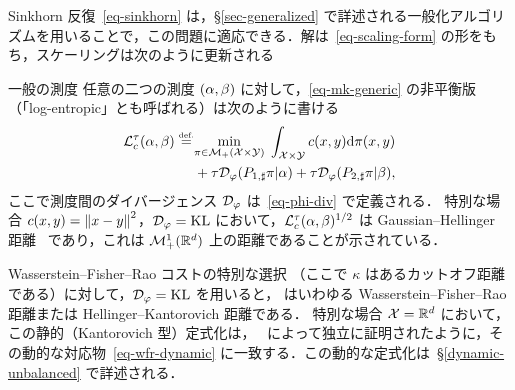Sinkhorn 反復~\eqref{eq-sinkhorn} は，\S\ref{sec-generalized} で詳述される一般化アルゴリズムを用いることで，この問題に適応できる．解は~\eqref{eq-scaling-form} の形をもち，スケーリングは次のように更新される

\begin{rem2}{一般の測度}
任意の二つの測度 $(\alpha,\beta)$ に対して，\eqref{eq-mk-generic} の非平衡版（「log-entropic」とも呼ばれる）は次のように書ける
\begin{align*}
	\mathcal{L}_c^\tau(\alpha,\beta) \stackrel{\mbox{\upshape\tiny def.}}{=}
	&\underset{\pi \in \mathcal{M}_+(\mathcal{X} \times \mathcal{Y})}{\min}\;
		\int_{\mathcal{X} \times \mathcal{Y}} c(x,y) \mathrm{d}\pi(x,y) \\
		&+ \tau \mathcal{D}_\varphi(P_{1,\sharp}\pi|\alpha)
		+ \tau \mathcal{D}_\varphi(P_{2,\sharp}\pi|\beta),
\end{align*}
ここで測度間のダイバージェンス $\mathcal{D}_\varphi$ は~\eqref{eq-phi-div} で定義される．
%
特別な場合 $c(x,y) = \left\| x-y \right\|^2$，$\mathcal{D}_\varphi=\operatorname{KL}$ において，$\mathcal{L}_c^\tau(\alpha,\beta)^{1/2}$ は Gaussian--Hellinger 距離~\citep{LieroMielkeSavareLong} であり，これは $\mathcal{M}_+^1(\mathbb{R}^d)$ 上の距離であることが示されている．
\end{rem2}

\begin{rem2}{Wasserstein--Fisher--Rao}\label{rem-wfr-static}
コストの特別な選択
（ここで $\kappa$ はあるカットオフ距離である）に対して，$\mathcal{D}_\varphi=\operatorname{KL}$ を用いると，
はいわゆる Wasserstein--Fisher--Rao 距離または Hellinger--Kantorovich 距離である．
%
特別な場合 $\mathcal{X}=\mathbb{R}^d$ において，この静的（Kantorovich 型）定式化は，~\citet{LieroMielkeSavareLong,2015-chizat-unbalanced} によって独立に証明されたように，その動的な対応物~\eqref{eq-wfr-dynamic} に一致する．この動的な定式化は~\S\ref{dynamic-unbalanced} で詳述される．
%
\end{rem2}

